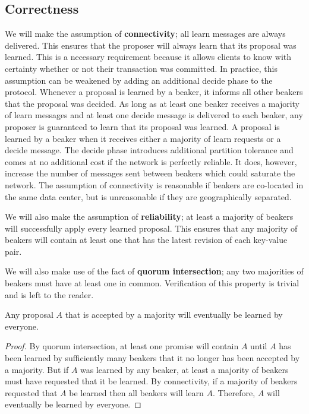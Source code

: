 \documentclass[../main.tex]{subfiles}
\begin{document}
  \subsection{Correctness}
  We will make the assumption of \textbf{connectivity}; all learn messages are always delivered.
  This ensures that the proposer will always learn that its proposal was learned. This is a
  necessary requirement because it allows clients to know with certainty whether or not their
  transaction was committed. In practice, this assumption can be weakened by adding an additional
  decide phase to the protocol. Whenever a proposal is learned by a beaker, it informs all other
  beakers that the proposal was decided. As long as at least one beaker receives a majority of
  learn messages and at least one decide message is delivered to each beaker, any proposer is
  guaranteed to learn that its proposal was learned. A proposal is learned by a beaker when it
  receives either a majority of learn requests or a decide message. The decide phase introduces
  additional partition tolerance and comes at no additional cost if the network is perfectly
  reliable. It does, however, increase the number of messages sent between beakers which could
  saturate the network. The assumption of connectivity is reasonable if beakers are co-located in
  the same data center, but is unreasonable if they are geographically separated.

  We will also make the assumption of \textbf{reliability}; at least a majority of beakers will
  successfully apply every learned proposal. This ensures that any majority of beakers will
  contain at least one that has the latest revision of each key-value pair.

  We will also make use of the fact of \textbf{quorum intersection}; any two majorities of beakers
  must have at least one in common. Verification of this property is trivial and is left to the
  reader. \\

  \begin{theorem}[Liveness]
    Any proposal $A$ that is accepted by a majority will eventually be learned by everyone.
  \end{theorem}
  \begin{proof}
    By quorum intersection, at least one promise will contain $A$ until $A$ has been learned by
    sufficiently many beakers that it no longer has been accepted by a majority. But if $A$ was
    learned by any beaker, at least a majority of beakers must have requested that it be learned.
    By connectivity, if a majority of beakers requested that $A$ be learned then all beakers will
    learn $A$. Therefore, $A$ will eventually be learned by everyone.
  \end{proof}
\end{document}
